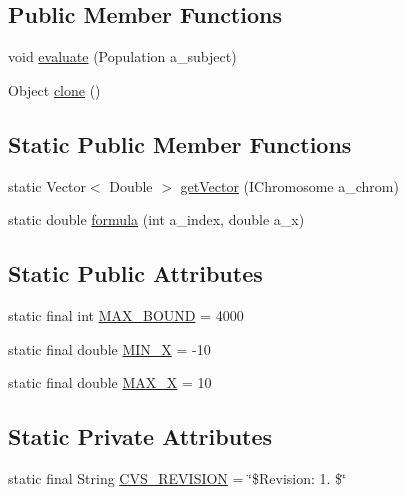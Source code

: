 \subsection*{Public Member Functions}
\begin{DoxyCompactItemize}
\item 
void \hyperlink{classexamples_1_1multiobjective_1_1_multi_objective_fitness_function_a8e02ddf34bc7632f0afbf274f7512319}{evaluate} (Population a\-\_\-subject)
\item 
Object \hyperlink{classexamples_1_1multiobjective_1_1_multi_objective_fitness_function_af02300518950820b85d0da68e14643a1}{clone} ()
\end{DoxyCompactItemize}
\subsection*{Static Public Member Functions}
\begin{DoxyCompactItemize}
\item 
static Vector$<$ Double $>$ \hyperlink{classexamples_1_1multiobjective_1_1_multi_objective_fitness_function_a7ce9929f1eea164a9090e5f2ca065065}{get\-Vector} (I\-Chromosome a\-\_\-chrom)
\item 
static double \hyperlink{classexamples_1_1multiobjective_1_1_multi_objective_fitness_function_a13610c3ceb60bf15600d786459e64a08}{formula} (int a\-\_\-index, double a\-\_\-x)
\end{DoxyCompactItemize}
\subsection*{Static Public Attributes}
\begin{DoxyCompactItemize}
\item 
static final int \hyperlink{classexamples_1_1multiobjective_1_1_multi_objective_fitness_function_abe3c154e06efaae92b95114962ed2f36}{M\-A\-X\-\_\-\-B\-O\-U\-N\-D} = 4000
\item 
static final double \hyperlink{classexamples_1_1multiobjective_1_1_multi_objective_fitness_function_ab01dfcf9674d7fe1baff858ce700e48c}{M\-I\-N\-\_\-\-X} = -\/10
\item 
static final double \hyperlink{classexamples_1_1multiobjective_1_1_multi_objective_fitness_function_a039b662c49738b20f0ca7e8c87550f4f}{M\-A\-X\-\_\-\-X} = 10
\end{DoxyCompactItemize}
\subsection*{Static Private Attributes}
\begin{DoxyCompactItemize}
\item 
static final String \hyperlink{classexamples_1_1multiobjective_1_1_multi_objective_fitness_function_a8d9bbaecd277d52459ffdb916414801a}{C\-V\-S\-\_\-\-R\-E\-V\-I\-S\-I\-O\-N} = \char`\"{}\$Revision\-: 1. \$\char`\"{}
\end{DoxyCompactItemize}


